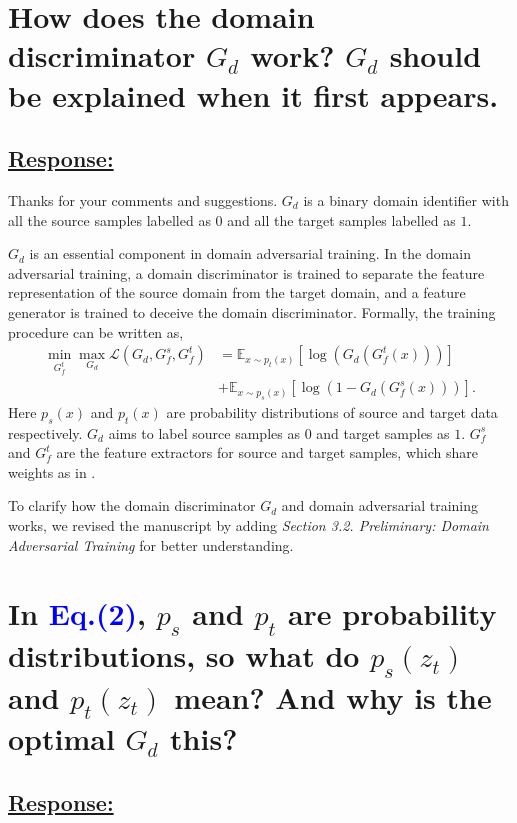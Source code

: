 \section{How does the domain discriminator $G_d$ work? $G_d$ should be explained when it first appears.}

\subsection*{\underline{\textbf{Response:}}}

Thanks for your comments and suggestions.
$G_d$ is a binary domain identifier with all the source samples labelled as $0$ and all the target samples labelled as $1$.

$G_d$ is an essential component in domain adversarial training.
In the domain adversarial training, a domain discriminator is trained to separate the feature representation of the source domain from the target domain, 
and a feature generator is trained to deceive the domain discriminator.
Formally, the training procedure can be written as,
\begin{equation}
    \label{eq: training DANN}
    \begin{split}
        \min_{G_f^t} \max_{G_d} \mathscr{L}(G_d,G^{s}_{f},G_f^t) &=\mathbb{E}_{x\sim p_t(x)} \left[ \log \left(G_d\left(G_f^t\left(x\right)\right)\right) \right]\\
        &+\mathbb{E}_{x\sim p_s(x)}\left[ \log \left(1-G_d\left(G_f^s\left(x\right)\right)\right) \right].
    \end{split}
\end{equation}
Here $p_s (x)$ and $p_t (x)$ are probability distributions of source and target data respectively.
$G_d$ aims to label source samples as $0$ and target samples as $1$.
$G_f^s$ and $G_f^t$ are the feature extractors for source and target samples, which share weights as in \cite{OpensetDA-bp}.

To clarify how the domain discriminator $G_d$ and domain adversarial training works, we revised the manuscript by adding \textit{Section 3.2. Preliminary: Domain Adversarial Training} for better understanding.


\section{In \textcolor{blue}{Eq.(2)}, $p_s$ and $p_t$ are probability distributions, so what do $p_s (z_t)$ and $p_t (z_t)$ mean? And why is the optimal $G_d$ this? }
\subsection*{\underline{\textbf{Response:}}}

